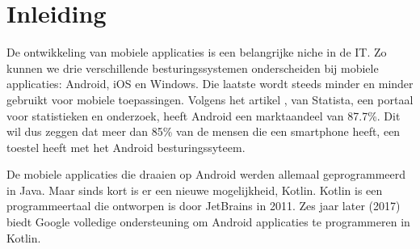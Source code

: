 
\chapter{Inleiding}
\label{ch:inleiding}




 De ontwikkeling van mobiele applicaties is een belangrijke niche in de IT. Zo kunnen we drie verschillende besturingssystemen onderscheiden bij mobiele applicaties: Android, iOS en Windows. Die laatste wordt steeds minder en minder gebruikt voor mobiele toepassingen. Volgens het artikel \textcite{Statista2018}, van Statista, een portaal voor statistieken en onderzoek, heeft Android een marktaandeel van 87.7\%. Dit wil dus zeggen dat meer dan 85\% van de mensen die een smartphone heeft, een toestel heeft met het Android besturingssyteem. 

 De mobiele applicaties die draaien op Android werden allemaal geprogrammeerd in Java. Maar sinds kort is er een nieuwe mogelijkheid, Kotlin. Kotlin is een programmeertaal die ontworpen is door JetBrains in 2011. Zes jaar later (2017) biedt Google volledige ondersteuning om Android applicaties te programmeren in Kotlin. 

